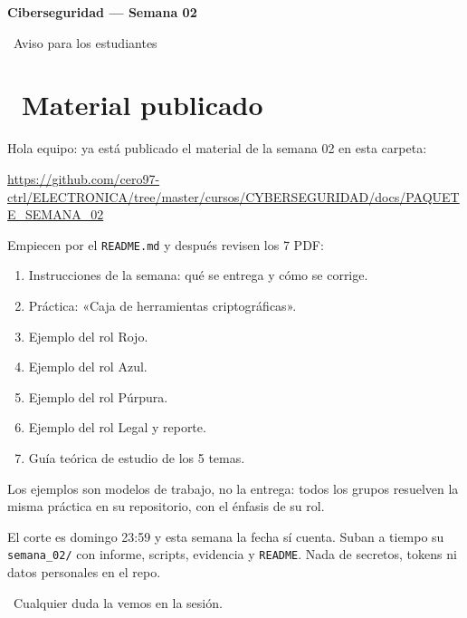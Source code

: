\documentclass[11pt,a4paper]{article}
\newcommand{\iconoBanda}{microchip}
\newcommand{\bandaTitulo}[3][fondoOscuro]{%
  \begin{tcolorbox}[
    enhanced,
    colback=#1, colframe=#1,
    boxrule=0pt, arc=8pt, outer arc=8pt,
    width=\linewidth,
    top=18pt, bottom=6pt, left=14pt, right=14pt,
    borderline south={3.5pt}{0pt}{cyanNeon},
  ]
    \begin{minipage}[c]{0.07\linewidth}
      \centering
      \textcolor{cyanNeon}{\fontsize{30}{30}\selectfont\faIcon{\iconoBanda}}
    \end{minipage}%
    \hspace{8pt}%
    \begin{minipage}[c]{0.88\linewidth}
      {\fontsize{20}{24}\selectfont\bfseries\color{white}#2}\par\vspace{5pt}%
      \textcolor{cyanNeon!80!white}{\small\faIcon{angle-right}~#3}%
    \end{minipage}
    \vspace{4pt}
  \end{tcolorbox}%
  \vspace{8pt}%
}
\begin{document}
\renewcommand{\iconoBanda}{book}

\bandaTitulo{Ciberseguridad --- Semana 02}{Aviso para los estudiantes}

\section*{~Material publicado}

Hola equipo: ya está publicado el material de la semana 02 en esta carpeta:

\begin{tcolorbox}[cajaContenido]
\url{https://github.com/cero97-ctrl/ELECTRONICA/tree/master/cursos/CYBERSEGURIDAD/docs/PAQUETE_SEMANA_02}
\end{tcolorbox}

Empiecen por el \texttt{README.md} y después revisen los 7 PDF:

\begin{enumerate}
  \item Instrucciones de la semana: qué se entrega y cómo se corrige.
  \item Práctica: «Caja de herramientas criptográficas».
  \item Ejemplo del rol Rojo.
  \item Ejemplo del rol Azul.
  \item Ejemplo del rol Púrpura.
  \item Ejemplo del rol Legal y reporte.
  \item Guía teórica de estudio de los 5 temas.
\end{enumerate}

Los ejemplos son modelos de trabajo, no la entrega: todos los grupos resuelven la misma práctica en su repositorio, con el énfasis de su rol.

\begin{cajaRecuerda}[title={\faIcon{thumbtack}~Recordatorio}]
El corte es domingo 23:59 y esta semana la fecha sí cuenta. Suban a tiempo su \texttt{semana\_02/} con informe, scripts, evidencia y \texttt{README}. Nada de secretos, tokens ni datos personales en el repo.
\end{cajaRecuerda}

\vspace{4pt}
\noindent \textcolor{verdeSignal}{}~Cualquier duda la vemos en la sesión.
\end{document}
